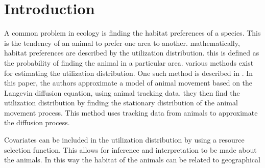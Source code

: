 \section{Introduction}

A common problem in ecology is finding the habitat preferences of a species. This is the tendency of an animal to prefer one area to another. mathematically, habitat preferences are described by the utilization distribution. this is defined as the probability of finding the animal in a particular area. various methods exist for estimating the utilization distribution. One such method is described in \cite{michelot_langevin_2019}. In this paper, the authors approximate a model of animal movement based on the Langevin diffusion equation, using animal tracking data. they then find the utilization distribution by finding the stationary distribution of the animal movement process. This method uses tracking data from animals to approximate the diffusion process. 

Covariates can be included in the utilization distribution by using a resource selection function. This allows for inference and interpretation to be made about the animals. In this way the habitat of the animals can be related to geographical 
\nocite{imt_software_wiki}  %